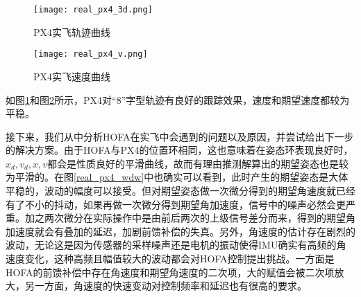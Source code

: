 \begin{figure}[!h]
  \centering
    \texttt{[image: real\_px4\_3d.png]}
    \caption{PX4实飞轨迹曲线}
    \label{real_px4_3d}
  \end{figure}
  \begin{figure}[!h]
    \centering
      \texttt{[image: real\_px4\_v.png]}
      \caption{PX4实飞速度曲线}
      \label{real_px4_v}

\end{figure}



如图\ref{real_px4_3d}和图\ref{real_px4_v}所示，PX4对“8”字型轨迹有良好的跟踪效果，速度和期望速度都较为平稳。

接下来，我们从中分析HOFA在实飞中会遇到的问题以及原因，并尝试给出下一步的解决方案。由于HOFA与PX4的位置环相同，这也意味着在姿态环表现良好时，$x_d,v_d,x,v$都会是性质良好的平滑曲线，故而有理由推测解算出的期望姿态也是较为平滑的。在图\ref{real_px4_wdw}中也确实可以看到，此时产生的期望姿态是大体平稳的，波动的幅度可以接受。但对期望姿态做一次微分得到的期望角速度就已经有了不小的抖动，如果再做一次微分得到期望角加速度，信号中的噪声必然会更严重。加之两次微分在实际操作中是由前后两次的上级信号差分而来，得到的期望角加速度就会有叠加的延迟，加剧前馈补偿的失真。另外，角速度的估计存在剧烈的波动，无论这是因为传感器的采样噪声还是电机的振动使得IMU确实有高频的角速度变化，这种高频且幅值较大的波动都会对HOFA控制提出挑战。一方面是HOFA的前馈补偿中存在角速度和期望角速度的二次项，大的赋值会被二次项放大，另一方面，角速度的快速变动对控制频率和延迟也有很高的要求。



